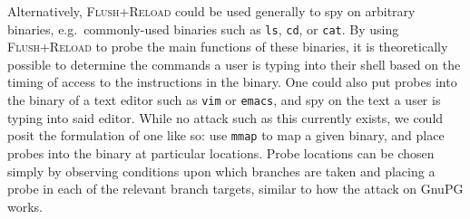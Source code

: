 \documentclass[11pt]{llncs}
\newcommand{\flushreload}{\textsc{Flush}+\textsc{Reload}}
\begin{document}
Alternatively, \flushreload{} could be used generally to spy on arbitrary
binaries, e.g.\ commonly-used binaries such as \texttt{ls}, \texttt{cd}, or
\texttt{cat}. By using \flushreload{} to probe the main functions of these
binaries, it is theoretically possible to determine the commands a user is
typing into their shell based on the timing of access to the instructions in the
binary. One could also put probes into the binary of a text editor such as
\texttt{vim} or \texttt{emacs}, and spy on the text a user is typing into said
editor. While no attack such as this currently exists, we could posit the
formulation of one like so: use \texttt{mmap} to map a given binary, and place
probes into the binary at particular locations. Probe locations can be chosen
simply by observing conditions upon which branches are taken and placing a probe
in each of the relevant branch targets, similar to how the attack on GnuPG
works.

\lobsectionbreak




\hspace*{7cm} 
 \hfill
\end{document}
